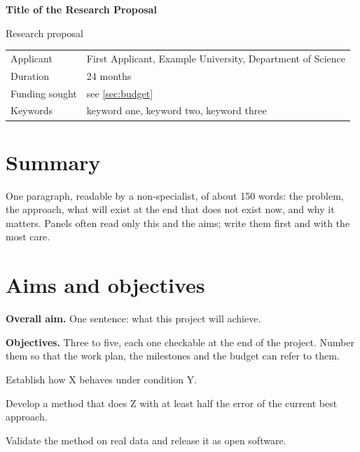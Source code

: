 \documentclass[11pt,a4paper,parskip=half-]{scrartcl}
\newcommand{\proposaltitle}{Title of the Research Proposal}
\newcommand{\applicant}{First Applicant}
\newcommand{\institution}{Example University, Department of Science}
\newcommand{\projectduration}{24 months}
\begin{document}
{\raggedright
\sffamily\bfseries\LARGE \proposaltitle\par}
\medskip
\noindent\textsf{\large Research proposal}\par
\vspace{0.6em}
\noindent\begin{tabularx}{\textwidth}{@{}l X@{}}
  \toprule
  \sffamily Applicant       & \applicant, \institution \\
  \sffamily Duration        & \projectduration \\
  \sffamily Funding sought  & see \cref{sec:budget} \\
  \sffamily Keywords        & keyword one, keyword two, keyword three \\
  \bottomrule
\end{tabularx}

\section*{Summary}
One paragraph, readable by a non-specialist, of about 150 words: the problem, the approach,
what will exist at the end that does not exist now, and why it matters. Panels often read only
this and the aims; write them first and with the most care.

\section{Aims and objectives}\label{sec:aims}
\textbf{Overall aim.} One sentence: what this project will achieve.

\textbf{Objectives.} Three to five, each one checkable at the end of the project. Number them
so that the work plan, the milestones and the budget can refer to them.
\begin{description}[leftmargin=2.2em,labelwidth=2em,labelsep=0.2em,font=\bfseries]
  \item[O1] Establish how X behaves under condition Y.
  \item[O2] Develop a method that does Z with at least half the error of the current best approach.
  \item[O3] Validate the method on real data and release it as open software.
\end{description}

\end{document}
